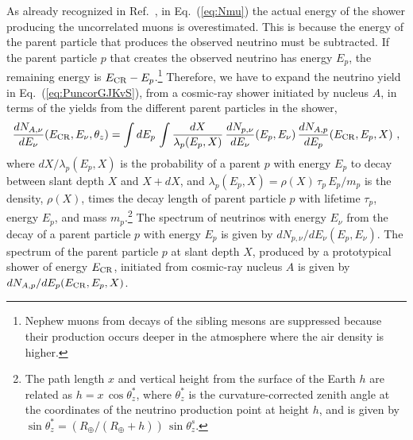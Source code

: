 \documentclass[aps,prd,showpacs,letterpaper,onecolumn,longbibliography,superscriptaddress,notitlepage,nofootinbib]{revtex4-1}%
\newcommand{\ECR}{E_{\rm CR}}
\begin{document}
As already recognized in Ref.~\cite{Gaisser:2014bja}, in Eq.~(\ref{eq:Nmu}) the actual energy of the shower producing the uncorrelated muons is overestimated. This is because the energy of the parent particle that produces the observed neutrino must be subtracted. If the parent particle $p$ that creates the observed neutrino has energy $E_p$, the remaining energy is $\ECR - E_p$.\footnote{Nephew muons from decays of the sibling mesons are suppressed because their production occurs deeper in the atmosphere where the air density is higher.} Therefore, we have to expand the neutrino yield in Eq.~(\ref{eq:PuncorGJKvS}), from a cosmic-ray shower initiated by nucleus $A$, in terms of the yields from the different parent particles in the shower,
%
\begin{equation}
\frac{dN_{A, \nu}}{dE_\nu}(\ECR, E_\nu, \theta_z) = \int dE_p \, \int \frac{dX}{\lambda_p(E_p, X)} \, \frac{dN_{p, \nu}}{dE_\nu}(E_p, E_\nu) \, \frac{dN_{A, p}}{dE_p}(\ECR, E_p, X) ~,
\end{equation}
%
where $dX/\lambda_p(E_p, X)$ is the probability of a parent $p$ with energy $E_p$ to decay between slant depth $X$ and $X + dX$, and $\lambda_p(E_p, X) = \rho(X) \, \tau_p \, E_p/m_p$ is the density, $\rho(X)$, times the decay length of parent particle $p$ with lifetime $\tau_p$, energy $E_p$, and mass $m_p$.\footnote{The path length $x$ and vertical height from the surface of the Earth $h$ are related as $h = x \, \cos\theta^*_z$, where $\theta^*_z$ is the curvature-corrected zenith angle at the coordinates of the neutrino production point at height $h$, and is given by $\sin \theta_z^* = \left(R_\oplus/(R_\oplus + h)\right) \, \sin \theta_z^s$.} The spectrum of neutrinos with energy $E_\nu$ from the decay of a parent particle $p$ with energy $E_p$ is given by $dN_{p, \nu}/dE_\nu(E_p,E_\nu)$. The spectrum of the parent particle $p$ at slant depth $X$, produced by a prototypical shower of energy $\ECR$, initiated from cosmic-ray nucleus $A$ is given by $dN_{A, p}/dE_p(\ECR, E_p, X)$.
\end{document}
